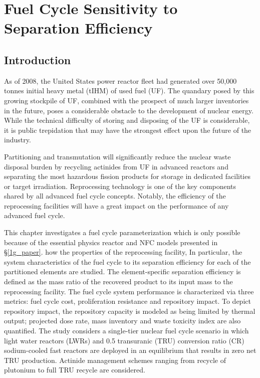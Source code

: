 \chapter{Fuel Cycle Sensitivity to Separation Efficiency}
\label{ses_paper}



\section{Introduction}
\label{ses_sec:intro}
As of 2008, the United States power reactor fleet had generated over
50,000 tonnes initial heavy metal (tIHM) of used fuel (UF). 
The quandary posed by this growing stockpile of UF, combined with the
prospect of much larger inventories in the future, poses a considerable
obstacle to the development of nuclear energy.  While the technical
difficulty of storing and disposing of the UF is considerable, it is
public trepidation that may have the strongest effect upon the future of
the industry.  

Partitioning and transmutation will significantly reduce the nuclear
waste disposal burden by recycling actinides from UF in advanced
reactors and separating the most hazardous fission products for storage
in dedicated facilities or target irradiation.  Reprocessing technology
is one of the key components shared by all advanced fuel cycle concepts.
 Notably, the efficiency of the reprocessing facilities will have a
great impact on the performance of any advanced fuel cycle. 

This chapter investigates a fuel cycle parameterization which is only possible 
because of the essential physics reactor and NFC models presented in \S \ref{1g_paper}.
how the properties of the reprocessing facility,
In particular, the system characteristics of the fuel cycle to its separation efficiency 
for each of the partitioned elements are studied. 
The element-specific separation efficiency is defined as the mass ratio of
the recovered product to its input mass to the reprocessing facility. 
The fuel cycle system performance is characterized via three metrics:
fuel cycle cost, proliferation resistance and repository impact.  To
depict repository impact, the repository capacity is modeled as being
limited by thermal output; projected dose rate, mass inventory and waste
toxicity index are also quantified.  The study considers a single-tier
nuclear fuel cycle scenario in which light water reactors (LWRs) and 0.5
transuranic (TRU) conversion ratio (CR) sodium-cooled fast reactors are
deployed in an equilibrium that results in zero net TRU production. 
Actinide management schemes ranging from recycle of plutonium to full
TRU recycle are considered.

